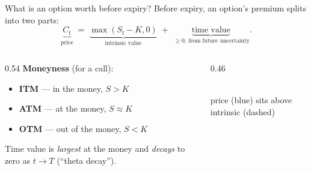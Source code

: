 \documentclass[11pt,aspectratio=169]{beamer}
\newcommand{\call}{C}
\newcommand{\strike}{K}
\newcommand{\und}{S}                         %
\begin{document}
\begin{frame}{What is an option worth before expiry?}
  Before expiry, an option's premium splits into two parts:
  \[
    \underbrace{\call_t}_{\text{price}} \;=\;
    \underbrace{\max(\und_t-\strike,0)}_{\text{intrinsic value}}
    \;+\;
    \underbrace{\text{time value}}_{\ \ge 0,\ \text{from future uncertainty}}.
  \]
  \begin{columns}[T]
    \begin{column}{0.54\textwidth}
      \textbf{Moneyness} (for a call):
      \begin{itemize}
        \item \textbf{ITM} — in the money, $\und>\strike$
        \item \textbf{ATM} — at the money, $\und\approx\strike$
        \item \textbf{OTM} — out of the money, $\und<\strike$
      \end{itemize}
      \vspace{0.3em}
      Time value is \emph{largest} at the money and \emph{decays} to zero
      as $t\to T$ (``theta decay'').
    \end{column}
    \begin{column}{0.46\textwidth}
      \centering
      \\
      {\tiny\color{muted}price (blue) sits above intrinsic (dashed)}
    \end{column}
  \end{columns}
\end{frame}
\end{document}
